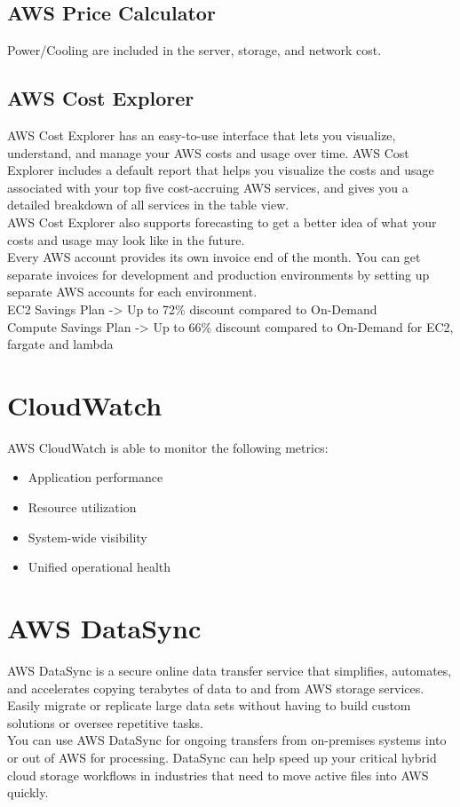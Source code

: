 \documentclass[12pt, letterpaper, twoside]{article}
\begin{document}
\subsection{AWS Price Calculator}
Power/Cooling are included in the server, storage, and network cost.


\subsection{AWS Cost Explorer}
AWS Cost Explorer has an easy-to-use interface that lets you visualize, understand, and manage your AWS costs and usage over 
time. AWS Cost Explorer includes a default report that helps you visualize the costs and usage associated with your top five 
cost-accruing AWS services, and gives you a detailed breakdown of all services in the table view.\\
AWS Cost Explorer also supports forecasting to get a better idea of what your costs and usage may look like in the future.\\

Every AWS account provides its own invoice end of the month. You can get separate invoices for development and 
production environments by setting up separate AWS accounts for each environment.\\

EC2 Savings Plan -> Up to 72\% discount compared to On-Demand\\
Compute Savings Plan -> Up to 66\% discount compared to On-Demand for EC2, fargate and lambda\\
\section{CloudWatch}
AWS CloudWatch is able to monitor the following metrics:
\begin{itemize}
	\item Application performance
	\item Resource utilization
	\item System-wide visibility
	\item Unified operational health
\end{itemize}

\section{AWS DataSync}
AWS DataSync is a secure online data transfer service that simplifies, automates, and accelerates copying 
terabytes of data to and from AWS storage services. Easily migrate or replicate large data sets without having 
to build custom solutions or oversee repetitive tasks.\\
You can use AWS DataSync for ongoing transfers from on-premises systems into or out of AWS for processing. 
DataSync can help speed up your critical hybrid cloud storage workflows in industries that need to move active 
files into AWS quickly.\\
\end{document}
